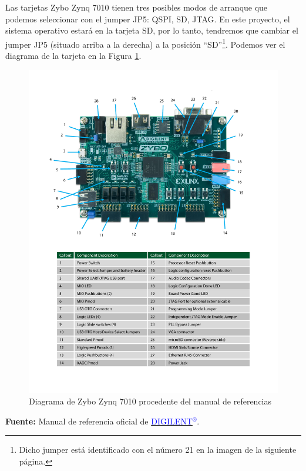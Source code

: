 Las tarjetas Zybo Zynq 7010 tienen tres posibles modos de arranque que podemos seleccionar con el jumper JP5: QSPI, SD, JTAG. En este proyecto, el sistema operativo estará en la tarjeta SD, por lo tanto, tendremos que cambiar el jumper JP5 (situado arriba a la derecha) a la posición ``SD''\footnote{Dicho jumper está identificado con el número 21 en la imagen de la siguiente página.}. Podemos ver el diagrama de la tarjeta en la Figura \ref{Diagrama de Zybo Zynq 7010 procedente del manual de referencias}.

\newpage
\begin{figure}[h]
	\centering
	\includegraphics[scale=0.69]{Anexos/Anexo2/Infraestructura/Datasheet.pdf}
	\caption{Diagrama de Zybo Zynq 7010 procedente del manual de referencias}
	\label{Diagrama de Zybo Zynq 7010 procedente del manual de referencias}
\end{figure}
\begin{center}
	\textbf{Fuente:} Manual de referencia oficial de \href{https://reference.digilentinc.com/_media/zybo:zybo_rm.pdf}{\textcolor{blue}{DIGILENT$^{\circledR}$}}.
\end{center}

